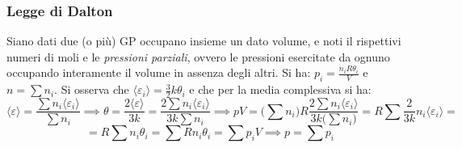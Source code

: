 \documentclass[10pt, oneside]{book}
\begin{document}
\subsubsection{Legge di Dalton}
Siano dati due (o più) GP occupano insieme un dato volume, e noti il rispettivi numeri di moli e le \textit{pressioni parziali}, ovvero le pressioni esercitate da ognuno occupando interamente il volume in assenza degli altri. Si ha: $\displaystyle p_i = \frac{n_i R \theta_i}{V}$ e  $n = \sum n_i$. Si osserva che $\langle \varepsilon_i \rangle = \frac{3}{2} k \theta_i$ e che per la media complessiva si ha: \[\langle \varepsilon \rangle = \frac{\sum n_i \langle \varepsilon_i \rangle}{\sum n_i} \implies \theta = \frac{2\langle \varepsilon \rangle}{3k} = \frac{2 \sum n_i \langle \varepsilon_i \rangle}{3 k \sum n_i} \implies pV = \big(\sum n_i\big) R \frac{2 \sum n_i \langle \varepsilon_i \rangle}{3 k \big(\sum n_i\big)} = R \sum \frac{2}{3k} n_i \langle \varepsilon_i \rangle =\]
\[= R \sum n_i \theta_i = \sum R n_i \theta_i = \sum p_i V \implies p = \sum p_i\]
\end{document}
